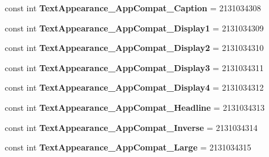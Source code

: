 \begin{DoxyCompactItemize}
\item 
\hypertarget{classClient_1_1Droid_1_1Resource_1_1Style_a6388e1d20dc4fdaae5c1d8bed6280952}{}const int {\bfseries Text\+Appearance\+\_\+\+App\+Compat\+\_\+\+Caption} = 2131034308\label{classClient_1_1Droid_1_1Resource_1_1Style_a6388e1d20dc4fdaae5c1d8bed6280952}

\item 
\hypertarget{classClient_1_1Droid_1_1Resource_1_1Style_af3476a9cf0b926493a8682a1039c5b70}{}const int {\bfseries Text\+Appearance\+\_\+\+App\+Compat\+\_\+\+Display1} = 2131034309\label{classClient_1_1Droid_1_1Resource_1_1Style_af3476a9cf0b926493a8682a1039c5b70}

\item 
\hypertarget{classClient_1_1Droid_1_1Resource_1_1Style_a8afbaf1ef7fa4528e6fbff9bc0bd5177}{}const int {\bfseries Text\+Appearance\+\_\+\+App\+Compat\+\_\+\+Display2} = 2131034310\label{classClient_1_1Droid_1_1Resource_1_1Style_a8afbaf1ef7fa4528e6fbff9bc0bd5177}

\item 
\hypertarget{classClient_1_1Droid_1_1Resource_1_1Style_a513eeb2d20055eb0a4f70b1bc3a94cbb}{}const int {\bfseries Text\+Appearance\+\_\+\+App\+Compat\+\_\+\+Display3} = 2131034311\label{classClient_1_1Droid_1_1Resource_1_1Style_a513eeb2d20055eb0a4f70b1bc3a94cbb}

\item 
\hypertarget{classClient_1_1Droid_1_1Resource_1_1Style_a391a70b9cd2237b61e3ffad76af3fe5c}{}const int {\bfseries Text\+Appearance\+\_\+\+App\+Compat\+\_\+\+Display4} = 2131034312\label{classClient_1_1Droid_1_1Resource_1_1Style_a391a70b9cd2237b61e3ffad76af3fe5c}

\item 
\hypertarget{classClient_1_1Droid_1_1Resource_1_1Style_a52f9c6112abc4eea203e505bae231a05}{}const int {\bfseries Text\+Appearance\+\_\+\+App\+Compat\+\_\+\+Headline} = 2131034313\label{classClient_1_1Droid_1_1Resource_1_1Style_a52f9c6112abc4eea203e505bae231a05}

\item 
\hypertarget{classClient_1_1Droid_1_1Resource_1_1Style_a98cfd2602b690dd1656fd772ebb9c439}{}const int {\bfseries Text\+Appearance\+\_\+\+App\+Compat\+\_\+\+Inverse} = 2131034314\label{classClient_1_1Droid_1_1Resource_1_1Style_a98cfd2602b690dd1656fd772ebb9c439}

\item 
\hypertarget{classClient_1_1Droid_1_1Resource_1_1Style_aa27acb1c7568409be47e97cddcc0a19a}{}const int {\bfseries Text\+Appearance\+\_\+\+App\+Compat\+\_\+\+Large} = 2131034315\label{classClient_1_1Droid_1_1Resource_1_1Style_aa27acb1c7568409be47e97cddcc0a19a}


\end{DoxyCompactItemize}
